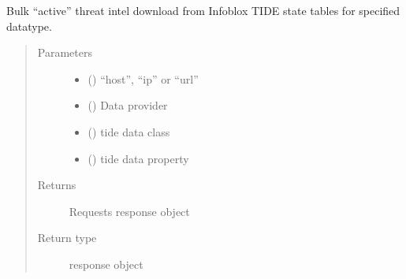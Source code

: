 \documentclass[letterpaper,10pt,english]{sphinxmanual}
\begin{document}
\begin{fulllineitems}
\begin{fulllineitems}
\label{\detokenize{b1td-class:bloxone.b1td.tideactivefeed}}
\sphinxAtStartPar
Bulk “active” threat intel download from Infoblox TIDE state tables
for specified datatype.
\begin{quote}\begin{description}
\item[{Parameters}] \leavevmode\begin{itemize}
\item {} 
\sphinxAtStartPar
{} () \textendash{} “host”, “ip” or “url”

\item {} 
\sphinxAtStartPar
{} (\sphinxstyleliteralemphasis{\sphinxupquote{, }}) \textendash{} Data provider

\item {} 
\sphinxAtStartPar
{} (\sphinxstyleliteralemphasis{\sphinxupquote{, }}) \textendash{} tide data class

\item {} 
\sphinxAtStartPar
{} (\sphinxstyleliteralemphasis{\sphinxupquote{, }}) \textendash{} tide data property

\end{itemize}

\item[{Returns}] \leavevmode
\sphinxAtStartPar
Requests response object

\item[{Return type}] \leavevmode
\sphinxAtStartPar
response object


\end{description}
\end{quote}
\end{fulllineitems}
\end{fulllineitems}
\end{document}

